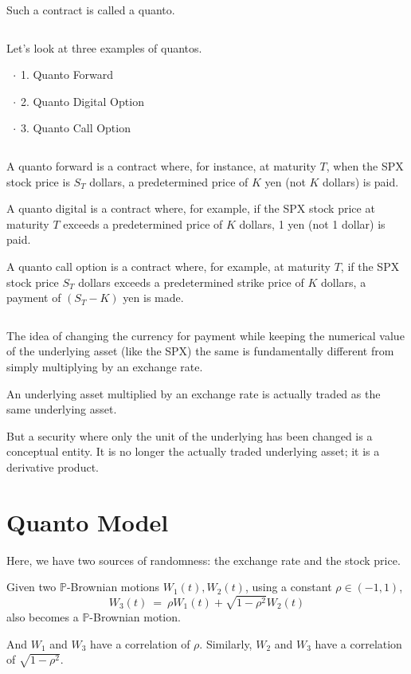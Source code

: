 \documentclass[uplatex,a4j,12pt,dvipdfmx]{jsarticle}
\begin{document}
Such a contract is called a quanto.

${}$

Let's look at three examples of quantos.

$\hspace{2mm} \cdot$
1. Quanto Forward

$\hspace{2mm} \cdot$
2. Quanto Digital Option

$\hspace{2mm} \cdot$
3. Quanto Call Option

${}$

A quanto forward is a contract where, for instance, at maturity $T$,
when the SPX stock price is $S_{T}$ dollars,
a predetermined price of $K$ yen (not $K$ dollars) is paid.

A quanto digital is a contract where, for example,
if the SPX stock price at maturity $T$
exceeds a predetermined price of $K$ dollars,
1 yen (not 1 dollar) is paid.

A quanto call option is a contract where, for example,
at maturity $T$, if the SPX stock price $S_{T}$ dollars
exceeds a predetermined strike price of $K$ dollars,
a payment of $(S_{T}-K)$ yen is made.

${}$

The idea of changing the currency for payment while keeping the numerical value
of the underlying asset (like the SPX) the same is fundamentally different
from simply multiplying by an exchange rate.

An underlying asset multiplied by an exchange rate is actually traded as the same underlying asset.

But a security where only the unit of the underlying has been changed is a conceptual entity.
It is no longer the actually traded underlying asset; it is a derivative product.

\section{Quanto Model}

Here, we have two sources of randomness: the exchange rate and the stock price.

Given two $\mathbb{P}$-Brownian motions $W_{1}(t),W_{2}(t)$,
using a constant $\rho \in (-1,1)$,
$$
	W_{3}(t)
	\ = \
	\rho W_{1}(t) +
	\sqrt{1 - \rho^{2} } W_{2}(t)
$$
also becomes a $\mathbb{P}$-Brownian motion.

And $W_{1}$ and $W_{3}$ have a correlation of $\rho$.
Similarly, $W_{2}$ and $W_{3}$ have a correlation of $\sqrt{1 - \rho^{2}}$.
\end{document}
